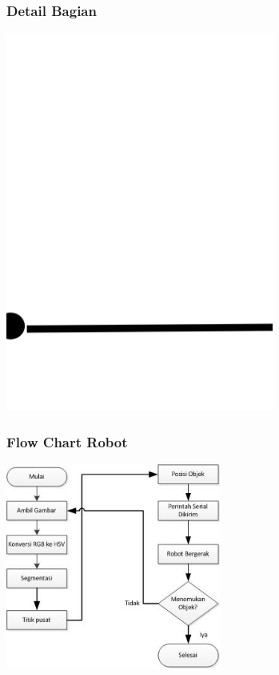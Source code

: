 \documentclass[table,dvipsnames]{beamer}
\begin{document}
\begin{frame}
\frametitle{Detail Bagian}
\begin{center}
 \includegraphics[width=250pt]{./progress/detail}
\end{center}
\end{frame}

\begin{frame}
\frametitle{Flow Chart Robot}
\begin{center}
 \includegraphics[width=200pt]{./progress/flowprogress}
\end{center}
\end{frame}
\end{document}

